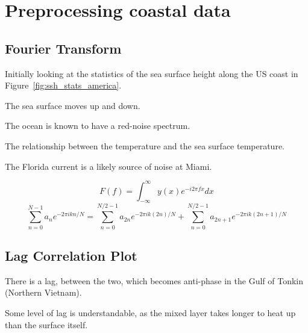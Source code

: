 \section{Preprocessing coastal data}
\subsection{Fourier Transform}
\label{sec:fourier}

Initially looking at the statistics of the sea surface height along the
US coast in Figure~\ref{fig:ssh_stats_america}.

The sea surface moves up and down.

The ocean is known to have a red-noise spectrum.

The relationship between the temperature and the sea surface temperature.

The Florida current is a likely source of noise at Miami.

\begin{equation}
F(f)=\int_{-\infty}^{\infty} y(x) e^{-i 2\pi f x} d x
\end{equation}
\begin{equation}
\sum_{n=0}^{N-1} a_{n} e^{-2 \pi i  k n/ N}=\sum_{n=0}^{N / 2-1} a_{2 n}
e^{-2 \pi i k (2 n)/ N} +\sum_{n=0}^{N / 2-1} a_{2n+1} e^{-2 \pi i k (2 n+1)/ N}
\end{equation}





\subsection{Lag Correlation Plot}
\label{sec:lag}

There is a lag, between the two, which becomes anti-phase in the Gulf
of Tonkin (Northern Vietnam).

Some level of lag is understandable, as the mixed layer takes longer
to heat up than the surface itself.


